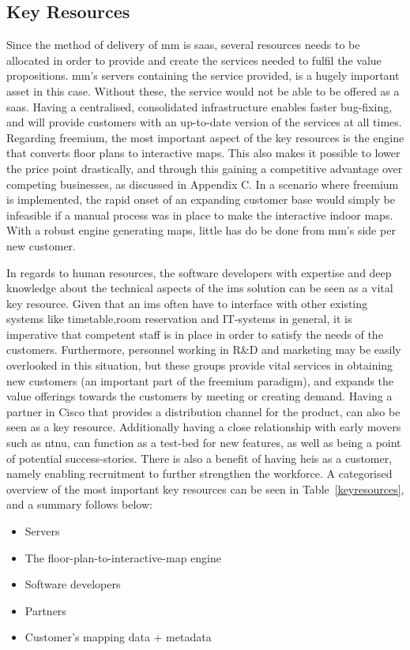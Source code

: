 \subsection{Key Resources}
Since the method of delivery of \gls{mm} is \gls{saas}, several resources needs to be allocated in order to provide and create the services needed to fulfil the value propositions. \gls{mm}'s servers containing the service provided, is a hugely important asset in this case. Without these, the service would not be able to be offered as a \gls{saas}. Having a centralised, consolidated infrastructure enables faster bug-fixing, and will provide customers with an up-to-date version of the services at all times. Regarding freemium, the most important aspect of the key resources is the engine that converts floor plans to interactive maps. This also makes it possible to lower the price point drastically, and through this gaining a competitive advantage over competing businesses, as discussed in Appendix C. In a scenario where freemium is implemented, the rapid onset of an expanding customer base would simply be infeasible if a manual process was in place to make the interactive indoor maps. With a robust engine generating maps, little has do be done from \gls{mm}'s side per new customer.


In regards to human resources, the software developers with expertise and deep knowledge about the technical aspects of the \gls{ims} solution can be seen as a vital key resource. Given that an \gls{ims} often have to interface with other existing systems like timetable,room reservation and IT-systems in general, it is imperative that competent staff is in place in order to satisfy the needs of the customers. Furthermore, personnel working in R\&D and marketing may be easily overlooked in this situation, but these groups provide vital services in obtaining new customers (an important part of the freemium paradigm), and expands the value offerings towards the customers by meeting or creating demand. Having a partner in Cisco that provides a distribution channel for the product, can also be seen as a key resource. Additionally having a close relationship with early movers such as \gls{ntnu}, can function as a test-bed for new features, as well as being a point of potential success-stories. There is also a benefit of having \glspl{hei} as a customer, namely enabling recruitment to further strengthen the workforce. A categorised overview of the most important key resources can be seen in Table~\ref{keyresources}, and a summary follows below:
\newpage
\begin{itemize}
    \item Servers
    \item The floor-plan-to-interactive-map engine
    \item Software developers
    \item Partners
    \item Customer's mapping data + metadata
\end{itemize}


